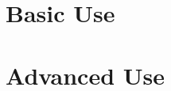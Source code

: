 \documentclass[12pt,fleqn]{book} %
\begin{document}
\tableofcontents %

\cleardoublepage %

\pagestyle{fancy} %



\part{Basic Use}
















\part{Advanced Use}
\end{document}
